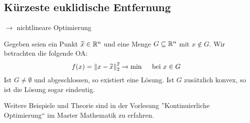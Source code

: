 \subsection{Kürzeste euklidische Entfernung}

$\to$ nichtlineare Optimierung

Gegeben seien ein Punkt $\widetilde{x} \in \mathbb{R}^n$ und eine Menge $G \subseteq \mathbb{R}^n$ mit $x \notin G$. Wir betrachten die folgende OA:
\begin{equation*}
	f(x) = \left\lVert x - \widetilde{x} \right\rVert_2^2 \to \min \quad \text{ bei } x \in G
\end{equation*}
Ist $G \neq \emptyset$ und abgeschlossen, so existiert eine Lösung. Ist $G$ zusätzlich konvex, so ist die Lösung sogar eindeutig.

Weitere Beispiele und Theorie sind in der Vorlesung ''Kontinuierliche Optimierung`` im Master Mathematik zu erfahren.